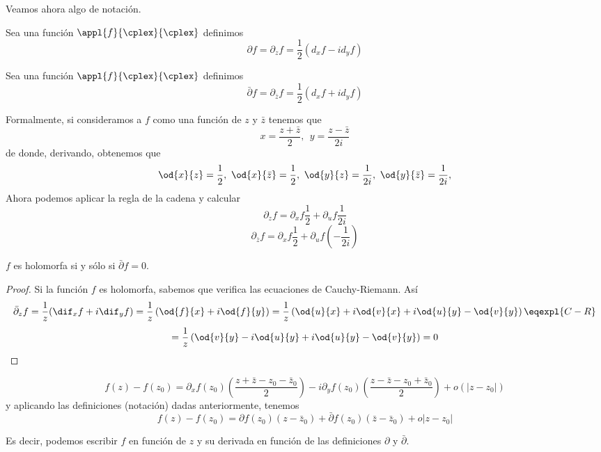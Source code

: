 \documentclass{apuntes}
\begin{document}
Veamos ahora algo de notación.

\begin{defn}
Sea una función $\appl{f}{\cplex}{\cplex}$ definimos
\[\partial f = \partial_z f = \frac{1}{2}(d_x f - i d_y f)\]
\end{defn}

\begin{defn}
Sea una función $\appl{f}{\cplex}{\cplex}$ definimos
\[\bar{\partial} f = \partial_{\bar{z}} f = \frac{1}{2}(d_x f + i d_y f)\]
\end{defn}

Formalmente, si consideramos a $f$ como una función de $z$ y $\bar{z}$ tenemos que
\[x = \frac{z+\bar{z}}{2}, \ \ y = \frac{z-\bar{z}}{2i}\]
de donde, derivando, obtenemos que
\[\od{x}{z}=\frac{1}{2}, \ \od{x}{\bar{z}}=\frac{1}{2}, \ \od{y}{z}=\frac{1}{2i}, \ \od{y}{\bar{z}}=\frac{1}{2i},\]
Ahora podemos aplicar la regla de la cadena y calcular
\[\partial_z f = \partial_x f \frac{1}{2}+\partial_u f \frac{1}{2i}\]
\[\partial_{\bar{z}} f = \partial_x f \frac{1}{2}+\partial_u f \left(-\frac{1}{2i}\right)\]

\begin{prop} $f$ es holomorfa si y sólo si $\bar{\partial}f=0$.
\end{prop}
\begin{proof}
Si la función $f$ es holomorfa, sabemos que verifica las ecuaciones de Cauchy-Riemann. Así
\[\bar{\partial}_z f = \frac{1}{z}(\dif_x f + i \dif_y f) = \frac{1}{z} \left(\od{f}{x}+i\od{f}{y} \right) = \frac{1}{z} \left( \od{u}{x}+i\od{v}{x} + i \od{u}{y} - \od{v}{y}\right) \eqexpl{C-R} \]
\[=\frac{1}{z} \left( \od{v}{y}-i\od{u}{y} + i \od{u}{y} - \od{v}{y}\right) = 0\]
\end{proof}

\begin{prop}
\[f(z)-f(z_0)=\partial_xf(z_0)\left(\frac{z+\bar{z}-z_0-\bar{z}_0}{2}\right)-i\partial_y f (z_0)\left( \frac{z-\bar{z}-z_0+\bar{z}_0}{2}\right) + o (|z-z_0|)\]
y aplicando las definiciones (notación) dadas anteriormente, tenemos
\[f(z)-f(z_0)= \partial f(z_0)(z-\bar{z}_0)+\bar{\partial}f(z_0)(\bar{z}-\bar{z}_0)+o|z-z_0|\]

Es decir, podemos escribir $f$ en función de $z$ y su derivada en función de las definiciones $\partial$ y $\bar{\partial}$.
\end{prop}
\end{document}
